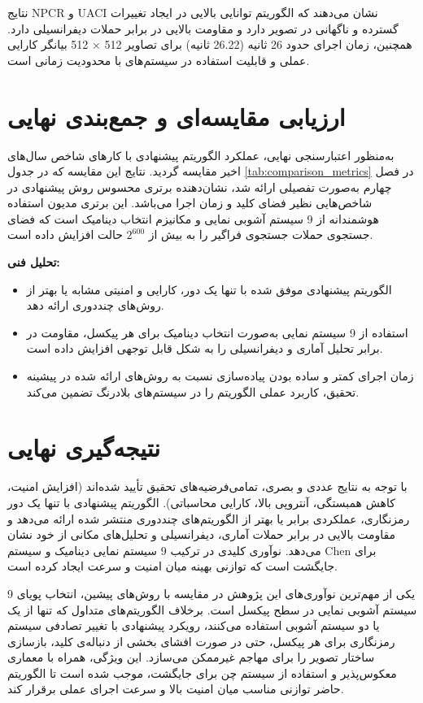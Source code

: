 \documentclass[a4paper,12pt]{report}
\renewcommand{\%}{\lr{\oldpercent}}
\providecommand{\lr}[1]{#1}
\begin{document}
نتایج \lr{NPCR} و \lr{UACI} نشان می‌دهند که الگوریتم توانایی بالایی در ایجاد تغییرات گسترده و ناگهانی در تصویر دارد و مقاومت بالایی در برابر حملات دیفرانسیلی دارد. همچنین، زمان اجرای حدود 26 ثانیه (26.22 ثانیه) برای تصاویر 512 × 512 بیانگر کارایی عملی و قابلیت استفاده در سیستم‌های با محدودیت زمانی است.

\section{ارزیابی مقایسه‌ای و جمع‌بندی نهایی}
به‌منظور اعتبارسنجی نهایی، عملکرد الگوریتم پیشنهادی با کارهای شاخص سال‌های اخیر مقایسه گردید. نتایج این مقایسه که در جدول \ref{tab:comparison_metrics} در فصل چهارم به‌صورت تفصیلی ارائه شد، نشان‌دهنده برتری محسوس روش پیشنهادی در شاخص‌هایی نظیر فضای کلید و زمان اجرا می‌باشد. این برتری مدیون استفاده هوشمندانه از 9 سیستم آشوبی نمایی و مکانیزم انتخاب دینامیک است که فضای جستجوی حملات جستجوی فراگیر را به بیش از $2^{600}$ حالت افزایش داده است.

\textbf{تحلیل فنی:}
\begin{itemize}
    \item الگوریتم پیشنهادی موفق شده با تنها یک دور، کارایی و امنیتی مشابه یا بهتر از روش‌های چنددوری ارائه دهد.
    \item استفاده از 9 سیستم نمایی به‌صورت انتخاب دینامیک برای هر پیکسل، مقاومت در برابر تحلیل آماری و دیفرانسیلی را به شکل قابل توجهی افزایش داده است.
    \item زمان اجرای کمتر و ساده بودن پیاده‌سازی نسبت به روش‌های ارائه شده در پیشینه تحقیق، کاربرد عملی الگوریتم را در سیستم‌های بلادرنگ تضمین می‌کند.
\end{itemize}

\section{نتیجه‌گیری نهایی}
با توجه به نتایج عددی و بصری، تمامی‌فرضیه‌های تحقیق تأیید شده‌اند (افزایش امنیت، کاهش همبستگی، آنتروپی بالا، کارایی محاسباتی). الگوریتم پیشنهادی با تنها یک دور رمزنگاری، عملکردی برابر یا بهتر از الگوریتم‌های چنددوری منتشر شده ارائه می‌دهد و مقاومت بالایی در برابر حملات آماری، دیفرانسیلی و تحلیل‌های مکانی از خود نشان می‌دهد. نوآوری کلیدی در ترکیب 9 سیستم نمایی دینامیک و سیستم \lr{Chen} برای جایگشت است که توازنی بهینه میان امنیت و سرعت ایجاد کرده است.

یکی از مهم‌ترین نوآوری‌های این پژوهش در مقایسه با روش‌های پیشین، انتخاب پویای 9 سیستم آشوبی نمایی در سطح پیکسل است. برخلاف الگوریتم‌های متداول که تنها از یک یا دو سیستم آشوبی استفاده می‌کنند، رویکرد پیشنهادی با تغییر تصادفی سیستم رمزنگاری برای هر پیکسل، حتی در صورت افشای بخشی از دنباله‌ی کلید، بازسازی ساختار تصویر را برای مهاجم غیرممکن می‌سازد. این ویژگی، همراه با معماری معکوس‌پذیر و استفاده از سیستم چن برای جایگشت، موجب شده است تا الگوریتم حاضر توازنی مناسب میان امنیت بالا و سرعت اجرای عملی برقرار کند.
\end{document}

